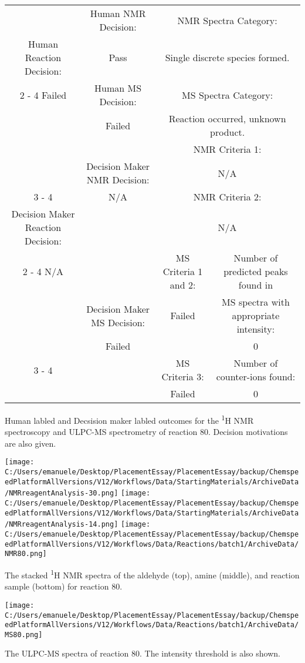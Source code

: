 \documentclass{article}%
\begin{document}
\begin{Decision Table}[H]%
\begin{tabular}{|c|c|c|c|}%
\hline%
&Human NMR Decision:&\multicolumn{2}{|c|}{NMR Spectra Category:}\\%
Human Reaction Decision:&Pass&\multicolumn{2}{|c|}{Single discrete species formed.}\\%
\cline{2%
-%
4}%
Failed&Human MS Decision:&\multicolumn{2}{|c|}{MS Spectra Category:}\\%
&Failed&\multicolumn{2}{|c|}{Reaction occurred, unknown product.}\\%
\hline%
&&\multicolumn{2}{|c|}{NMR Criteria 1:}\\%
&Decision Maker NMR Decision:&\multicolumn{2}{|c|}{N/A}\\%
\cline{3%
-%
4}%
&N/A&\multicolumn{2}{|c|}{NMR Criteria 2:}\\%
Decision Maker Reaction Decision:&&\multicolumn{2}{|c|}{N/A}\\%
\cline{2%
-%
4}%
N/A&&MS Criteria 1 and 2:&Number of predicted peaks found in\\%
&Decision Maker MS Decision:&Failed&MS spectra with appropriate intensity:\\%
&Failed&&0\\%
\cline{3%
-%
4}%
&&MS Criteria 3:&Number of counter{-}ions found:\\%
&&Failed&0\\%
\hline%
\end{tabular}%
\caption{Human labled and Decsision maker labled outcomes for the \textsuperscript{1}H NMR spectroscopy and ULPC-MS spectrometry of reaction 80. Decision motivations are also given.}%
\end{Decision Table}%
\begin{NMR Spectra}[H]%
\begin{center}%
\texttt{[image: C:/Users/emanuele/Desktop/PlacementEssay/PlacementEssay/backup/ChemspeedPlatformAllVersions/V12/Workflows/Data/StartingMaterials/ArchiveData/NMRreagentAnalysis-30.png]}\hfill%
\texttt{[image: C:/Users/emanuele/Desktop/PlacementEssay/PlacementEssay/backup/ChemspeedPlatformAllVersions/V12/Workflows/Data/StartingMaterials/ArchiveData/NMRreagentAnalysis-14.png]}\hfill%
\texttt{[image: C:/Users/emanuele/Desktop/PlacementEssay/PlacementEssay/backup/ChemspeedPlatformAllVersions/V12/Workflows/Data/Reactions/batch1/ArchiveData/NMR80.png]}\hfill%
\end{center}%
\caption{The stacked \textsuperscript{1}H NMR spectra of the aldehyde (top), amine (middle), and reaction sample (bottom) for reaction 80.}%
\end{NMR Spectra}%
\begin{MS Spectra}[H]%
\begin{center}%
\texttt{[image: C:/Users/emanuele/Desktop/PlacementEssay/PlacementEssay/backup/ChemspeedPlatformAllVersions/V12/Workflows/Data/Reactions/batch1/ArchiveData/MS80.png]}\hfill%
\end{center}%
\caption{The ULPC-MS spectra of reaction 80. The intensity threshold is also shown.}%
\end{MS Spectra}%
\end{document}
